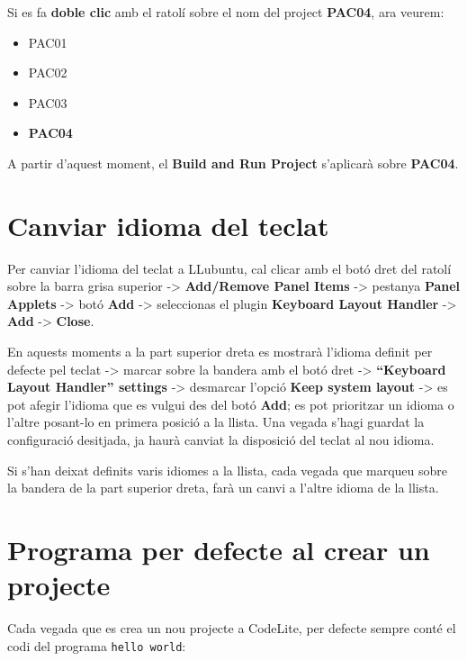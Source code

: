 \documentclass[
]{book}
\providecommand{\tightlist}{%
  \setlength{\itemsep}{0pt}\setlength{\parskip}{0pt}}
\begin{document}
Si es fa \textbf{doble clic} amb el ratolí sobre el nom del project \textbf{PAC04}, ara veurem:

\begin{itemize}
\tightlist
\item
  PAC01
\item
  PAC02
\item
  PAC03
\item
  \textbf{PAC04}
\end{itemize}

A partir d'aquest moment, el \textbf{Build and Run Project} s'aplicarà sobre \textbf{PAC04}.

\hypertarget{canviar-idioma-del-teclat}{%
\section{Canviar idioma del teclat}\label{canviar-idioma-del-teclat}}

Per canviar l'idioma del teclat a LLubuntu, cal clicar amb el botó dret del ratolí sobre la barra grisa superior -\textgreater{} \textbf{Add/Remove Panel Items} -\textgreater{} pestanya \textbf{Panel Applets} -\textgreater{} botó \textbf{Add} -\textgreater{} seleccionas el plugin \textbf{Keyboard Layout Handler} -\textgreater{} \textbf{Add} -\textgreater{} \textbf{Close}.

En aquests moments a la part superior dreta es mostrarà l'idioma definit per defecte pel teclat -\textgreater{} marcar sobre la bandera amb el botó dret -\textgreater{} \textbf{``Keyboard Layout Handler'' settings} -\textgreater{} desmarcar l'opció \textbf{Keep system layout} -\textgreater{} es pot afegir l'idioma que es vulgui des del botó \textbf{Add}; es pot prioritzar un idioma o l'altre posant-lo en primera posició a la llista. Una vegada s'hagi guardat la configuració desitjada, ja haurà canviat la disposició del teclat al nou idioma.

Si s'han deixat definits varis idiomes a la llista, cada vegada que marqueu sobre la bandera de la part superior dreta, farà un canvi a l'altre idioma de la llista.

\hypertarget{programa-per-defecte-al-crear-un-projecte}{%
\section{Programa per defecte al crear un projecte}\label{programa-per-defecte-al-crear-un-projecte}}

Cada vegada que es crea un nou projecte a CodeLite, per defecte sempre conté el codi del programa \texttt{hello\ world}:
\end{document}
